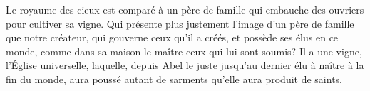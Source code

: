 Le royaume des cieux est comparé à un père de famille
		qui embauche des ouvriers pour cultiver sa vigne.
Qui présente plus justement l'image d'un père de famille que notre créateur,
	qui gouverne ceux qu'il a créés, et possède ses élus en ce monde,
	comme dans sa maison le maître ceux qui lui sont soumis?
Il a une vigne, l'Église universelle,
	laquelle, depuis Abel le juste jusqu'au dernier élu à naître à la fin du monde,
	aura poussé autant de sarments qu'elle aura produit de saints.
